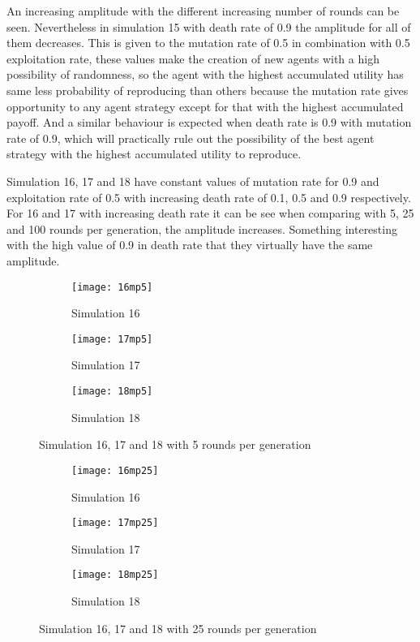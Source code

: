 An increasing amplitude with the different increasing number of rounds can be seen. Nevertheless in simulation 15 with death rate of 0.9 the amplitude for all of them decreases. This is given to the mutation rate of 0.5 in combination with 0.5 exploitation rate, these values make the creation of new agents with a high possibility of randomness, so the agent with the highest accumulated utility has same less probability of reproducing than others because the mutation rate gives opportunity to any agent strategy except for that with the highest accumulated payoff. And a similar behaviour is expected when death rate is 0.9 with mutation rate of 0.9, which will practically rule out the possibility of the best agent strategy with the highest accumulated utility to reproduce.

Simulation 16, 17 and 18  have constant values of mutation rate for 0.9 and exploitation rate of 0.5 with increasing death rate of 0.1, 0.5 and 0.9 respectively. For 16 and 17 with increasing death rate it can be see when comparing with 5, 25 and 100 rounds per generation, the amplitude increases. Something interesting with the high value of 0.9 in death rate that they virtually have the same amplitude.

\begin{figure}[H]       
    \centering
    \begin{subfigure}[b]{0.3\textwidth}
	\centering
	{\texttt{[image: 16mp5]}}   
    	\caption{Simulation 16}
	\label{fig:mpsim165}
    \end{subfigure}
    \hfill
    \begin{subfigure}[b]{0.3\textwidth}
	\centering
	{\texttt{[image: 17mp5]}}   
    	\caption{Simulation 17}
	\label{fig:mpsim175}
    \end{subfigure}
    \hfill
    \begin{subfigure}[b]{0.3\textwidth}
	\centering
	{\texttt{[image: 18mp5]}}   
    	\caption{Simulation 18}
	\label{fig:mpsim185}
    \end{subfigure}
    \caption{Simulation 16, 17 and 18 with 5 rounds per generation}
    \label{mpsim161718simulations5}
\end{figure}

\begin{figure}[H]       
    \centering
    \begin{subfigure}[b]{0.3\textwidth}
	\centering
	{\texttt{[image: 16mp25]}}   
    	\caption{Simulation 16}
	\label{fig:mpsim1625}
    \end{subfigure}
    \hfill
    \begin{subfigure}[b]{0.3\textwidth}
	\centering
	{\texttt{[image: 17mp25]}}   
    	\caption{Simulation 17}
	\label{fig:mpsim175}
    \end{subfigure}
    \hfill
    \begin{subfigure}[b]{0.3\textwidth}
	\centering
	{\texttt{[image: 18mp25]}}   
    	\caption{Simulation 18}
	\label{fig:mpsim1825}
    \end{subfigure}
    \caption{Simulation 16, 17 and 18 with 25 rounds per generation}
    \label{mpsim161718simulations25}
\end{figure}

